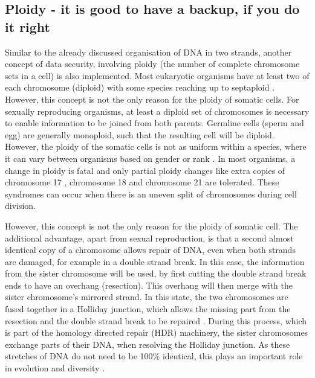 \subsection[Ploidy]{Ploidy - it is good to have a backup, if you do it right}
\label{intro-sec:ploidy}
Similar to the already discussed organisation of DNA in two strands, another concept of data security, involving ploidy (the number of complete chromosome sets in a cell) is also implemented. Most eukaryotic organisms have at least two of each chromosome (diploid) with some species reaching up to septaploid \cite{Tateoka1975}. However, this concept is not the only reason for the ploidy of somatic cells. For sexually reproducing organisms, at least a diploid set of chromosomes is necessary to enable information to be joined from both parents. Germline cells (sperm and egg) are generally monoploid, such that the resulting cell will be diploid. However, the ploidy of the somatic cells is not as uniform within a species, where it can vary between organisms based on gender or rank \cite{Trivers1976}. 
In most organisms, a change in ploidy is fatal \cite{Otto2007} and only partial ploidy changes like extra copies of chromosome 17 \cite{Gottlieb1962}, chromosome 18 \cite{Cereda2012} and chromosome 21 \cite{Hulten2008} are tolerated. These syndromes can occur when there is an uneven split of chromosomes during cell division.

However, this concept is not the only reason for the ploidy of somatic cell. The additional advantage, apart from sexual reproduction, is that a second almost identical copy of a chromosome allows repair of DNA, even when both strands are damaged, for example in a double strand break.
In this case, the information from the sister chromosome will be used, by first cutting the double strand break ends to have an overhang (resection). This overhang will then merge with the sister chromosome's mirrored strand. In this state, the two chromosomes are fused together in a Holliday junction, which allows the missing part from the resection and the double strand break to be repaired \cite{Lilley2000}. During this process, which is part of the homology directed repair (HDR) machinery, the sister chromosomes exchange parts of their DNA, when resolving the Holliday junction. As these stretches of DNA do not need to be 100\% identical, this plays an important role in evolution and diversity \cite{Hanage2006,Kong2013}.


